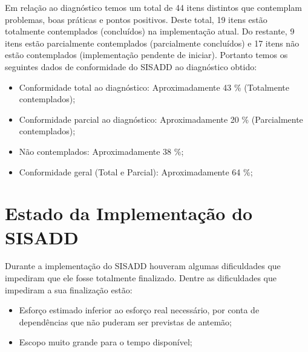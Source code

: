 Em relação ao diagnóstico temos um total de 44 itens distintos que contemplam problemas, boas práticas e pontos positivos. Deste total, 19 itens estão totalmente contemplados (concluídos) na implementação atual. Do restante, 9 itens estão parcialmente contemplados (parcialmente concluídos) e 17 itens não estão contemplados (implementação pendente de iniciar). Portanto temos os seguintes dados de conformidade do SISADD ao diagnóstico obtido:
\begin{itemize}
\item Conformidade total ao diagnóstico: Aproximadamente 43 \% (Totalmente contemplados);
\item Conformidade parcial ao diagnóstico: Aproximadamente 20 \% (Parcialmente contemplados);
\item Não contemplados: Aproximadamente 38 \%;
\item Conformidade geral (Total e Parcial): Aproximadamente 64 \%;
\end{itemize}

\section{Estado da Implementação do SISADD} \label{estado_implementacao}

Durante a implementação do SISADD houveram algumas dificuldades que impediram que ele fosse totalmente finalizado. Dentre as dificuldades que impediram a sua finalização estão:
\begin{itemize}
\item Esforço estimado inferior ao esforço real necessário, por conta de dependências que não puderam ser previstas de antemão;
\item Escopo muito grande para o tempo disponível;
\end{itemize}

